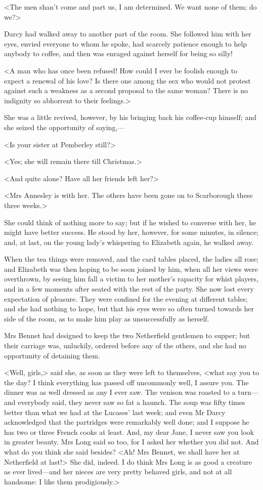 <The men shan't come and part us, I am determined. We want none of them; do we?>

Darcy had walked away to another part of the room. She followed him with her eyes, envied everyone to whom he spoke, had scarcely patience enough to help anybody to coffee, and then was enraged against herself for being so silly!

<A man who has once been refused! How could I ever be foolish enough to expect a renewal of his love? Is there one among the sex who would not protest against such a weakness as a second proposal to the same woman? There is no indignity so abhorrent to their feelings.>

She was a little revived, however, by his bringing back his coffee-cup himself; and she seized the opportunity of saying,—

<Is your sister at Pemberley still?>

<Yes; she will remain there till Christmas.>

<And quite alone? Have all her friends left her?>

<Mrs Annesley is with her. The others have been gone on to Scarborough these three weeks.>

She could think of nothing more to say; but if he wished to converse with her, he might have better success. He stood by her, however, for some minutes, in silence; and, at last, on the young lady's whispering to Elizabeth again, he walked away.

When the tea things were removed, and the card tables placed, the ladies all rose; and Elizabeth was then hoping to be soon joined by him, when all her views were overthrown, by seeing him fall a victim to her mother's rapacity for whist players, and in a few moments after seated with the rest of the party. She now lost every expectation of pleasure. They were confined for the evening at different tables; and she had nothing to hope, but that his eyes were so often turned towards her side of the room, as to make him play as unsuccessfully as herself.

Mrs Bennet had designed to keep the two Netherfield gentlemen to supper; but their carriage was, unluckily, ordered before any of the others, and she had no opportunity of detaining them.

<Well, girls,> said she, as soon as they were left to themselves, <what say you to the day? I think everything has passed off uncommonly well, I assure you. The dinner was as well dressed as any I ever saw. The venison was roasted to a turn—and everybody said, they never saw so fat a haunch. The soup was fifty times better than what we had at the Lucases' last week; and even Mr Darcy acknowledged that the partridges were remarkably well done; and I suppose he has two or three French cooks at least. And, my dear Jane, I never saw you look in greater beauty. Mrs Long said so too, for I asked her whether you did not. And what do you think she said besides? <Ah! Mrs Bennet, we shall have her at Netherfield at last!> She did, indeed. I do think Mrs Long is as good a creature as ever lived—and her nieces are very pretty behaved girls, and not at all handsome: I like them prodigiously.>

